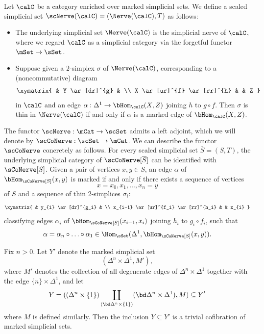 \begin{definition}\label{ilmut}
Let $\calC$ be a category enriched over marked simplicial sets. We
define a scaled simplicial set $\scNerve( \calC) = ( \Nerve(\calC), T)$
as follows:
\begin{itemize}
\item[$(1)$] The underlying simplicial set $\Nerve(\calC)$ is the simplicial
nerve of $\calC$, where we regard $\calC$ as a simplicial category via the forgetful
functor $\mSet \rightarrow \sSet$.
\item[$(2)$] Suppose given a $2$-simplex $\sigma$ of $\Nerve(\calC)$, corresponding to
a (noncommutative) diagram
$$ \xymatrix{ & Y \ar[dr]^{g} & \\
X \ar[ur]^{f} \ar[rr]^{h} & & Z }$$
in $\calC$ and an edge $\alpha: \Delta^1 \rightarrow \bHom_{\calC}( X, Z)$ joining
$h$ to $g \circ f$. Then $\sigma$ is thin in $\Nerve(\calC)$ if and only if $\alpha$
is a marked edge of $\bHom_{\calC}(X,Z)$. 
\end{itemize}
\end{definition}

The functor $\scNerve: \mCat \rightarrow \scSet$ admits a left adjoint, which we will denote
by $\scCoNerve: \scSet \rightarrow \mCat$. We can describe the functor
$\scCoNerve$ concretely as follows. For every scaled simplicial set $\overline{S} = (S,T)$, 
the underlying simplicial category of $\scCoNerve[\overline{S}]$ can be identified with
$\sCoNerve[S]$. Given a pair of vertices $x,y \in S$, an edge
$\alpha$ of  $\bHom_{\sCoNerve[S]}(x,y)$ is marked if and only if there
exists a sequence of vertices 
$$ x = x_0, x_1, \ldots, x_n = y$$
of $S$ and a sequence of thin $2$-simplices $\sigma_i:$
$$ \xymatrix{ & y_{i} \ar[dr]^{g_i} & \\
x_{i-1} \ar[ur]^{f_i} \ar[rr]^{h_i} & & x_{i} }$$
classifying edges $\alpha_{i}$ of $\bHom_{\sCoNerve[S]}(x_{i-1}, x_i)$
joining $h_{i}$ to $g_i \circ f_i$, such that 
$$ \alpha = \alpha_{n} \circ \ldots \circ \alpha_{1} \in \Hom_{\sSet}( \Delta^1, \bHom_{\sCoNerve[S]}(x,y)).$$

\begin{lemma}\label{preperc}
Fix $n > 0$. Let $Y'$ denote the marked simplicial set
$$ ( \Delta^n \times \Delta^1, M' ),$$
where $M'$ denotes the collection of all degenerate edges of $\Delta^n \times \Delta^1$ together
with the edge $\{n\} \times \Delta^1$, and let
$$ Y = ( (\Delta^n \times \{1\}) \coprod_{ ( \bd \Delta^n \times \{1\} ) } ( \bd \Delta^n \times \Delta^1), M
) \subseteq Y'$$
where $M$ is defined similarly. Then the inclusion $Y \subseteq Y'$ is a trivial cofibration of marked simplicial sets.
\end{lemma}

